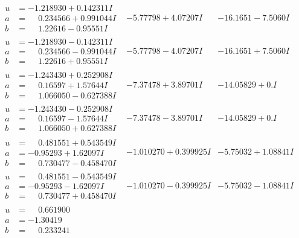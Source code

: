 \documentclass[1p]{elsarticle_modified}
\theoremstyle{definition}
\begin{document}
$$\begin{array}{c|c|c}
\begin{aligned}
u &= -1.218930 + 0.142311 I \\
a &= \phantom{-}0.234566 + 0.991044 I \\
b &= \phantom{-}1.22616 - 0.95551 I\end{aligned}
 & -5.77798 + 4.07207 I & -16.1651 - 7.5060 I \\ \hline\begin{aligned}
u &= -1.218930 - 0.142311 I \\
a &= \phantom{-}0.234566 - 0.991044 I \\
b &= \phantom{-}1.22616 + 0.95551 I\end{aligned}
 & -5.77798 - 4.07207 I & -16.1651 + 7.5060 I \\ \hline\begin{aligned}
u &= -1.243430 + 0.252908 I \\
a &= \phantom{-}0.16597 + 1.57644 I \\
b &= \phantom{-}1.066050 - 0.627388 I\end{aligned}
 & -7.37478 + 3.89701 I & -14.05829 + 0. I\phantom{ +0.000000I} \\ \hline\begin{aligned}
u &= -1.243430 - 0.252908 I \\
a &= \phantom{-}0.16597 - 1.57644 I \\
b &= \phantom{-}1.066050 + 0.627388 I\end{aligned}
 & -7.37478 - 3.89701 I & -14.05829 + 0. I\phantom{ +0.000000I} \\ \hline\begin{aligned}
u &= \phantom{-}0.481551 + 0.543549 I \\
a &= -0.95293 + 1.62097 I \\
b &= \phantom{-}0.730477 - 0.458470 I\end{aligned}
 & -1.010270 + 0.399925 I & -5.75032 + 1.08841 I \\ \hline\begin{aligned}
u &= \phantom{-}0.481551 - 0.543549 I \\
a &= -0.95293 - 1.62097 I \\
b &= \phantom{-}0.730477 + 0.458470 I\end{aligned}
 & -1.010270 - 0.399925 I & -5.75032 - 1.08841 I \\ \hline\begin{aligned}
u &= \phantom{-}0.661900\phantom{ +0.000000I} \\
a &= -1.30419\phantom{ +0.000000I} \\
b &= \phantom{-}0.233241\phantom{ +0.000000I}\end{aligned}

\end{array}$$
\end{document}
